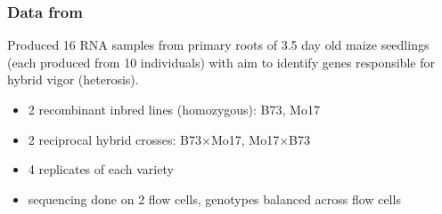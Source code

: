 \documentclass{beamer}
\begin{document}
\begin{frame}%
\frametitle{Data from \citet{paschold}}
Produced 16 RNA samples from primary roots of 3.5 day old maize seedlings (each produced from 10 individuals) with aim to identify genes responsible for hybrid vigor (heterosis).
\vspace{.5cm}
\pause\begin{beamerboxesrounded}[upper=upcol,lower=lowcol,shadow=true]{}
\begin{itemize}
\item 2 recombinant inbred lines (homozygous): B73, Mo17
\item 2 reciprocal hybrid crosses: B73$\times$Mo17, Mo17$\times$B73
\item 4 replicates of each variety
\item sequencing done on 2 flow cells, genotypes balanced across flow cells
\end{itemize}
\end{beamerboxesrounded}
\end{frame}
\end{document}
